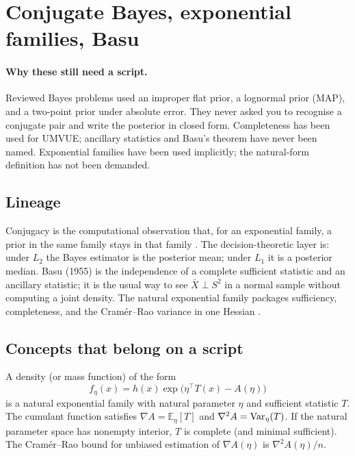 \section{Conjugate Bayes, exponential families, Basu}
\label{sec:bayes}

\paragraph{Why these still need a script.}
Reviewed Bayes problems used an improper flat prior, a lognormal prior (MAP), and a two-point prior under absolute error. They never asked you to recognise a conjugate pair and write the posterior in closed form. Completeness has been used for UMVUE; ancillary statistics and Basu's theorem have never been named. Exponential families have been used implicitly; the natural-form definition has not been demanded.

\subsection{Lineage}

Conjugacy is the computational observation that, for an exponential family, a prior in the same family stays in that family \cite{gelman13,hogg19}. The decision-theoretic layer is: under \(L_{2}\) the Bayes estimator is the posterior mean; under \(L_{1}\) it is a posterior median. Basu (1955) is the independence of a complete sufficient statistic and an ancillary statistic; it is the usual way to see \(\bar X\perp S^{2}\) in a normal sample without computing a joint density. The natural exponential family packages sufficiency, completeness, and the Cram\'er--Rao variance in one Hessian \cite{casella02}.

\subsection{Concepts that belong on a script}

\begin{definition}
\label{def:nef}
A density (or mass function) of the form
\[
f_{\eta}(x)=h(x)\exp\bigl(\eta^{\top}T(x)-A(\eta)\bigr)
\]
is a natural exponential family with natural parameter \(\eta\) and sufficient statistic \(T\). The cumulant function satisfies \(\nabla A=\mathbb{E}_{\eta}[T]\) and \(\nabla^{2}A=\operatorname{Var}_{\eta}(T)\). If the natural parameter space has nonempty interior, \(T\) is complete (and minimal sufficient). The Cram\'er--Rao bound for unbiased estimation of \(\nabla A(\eta)\) is \(\nabla^{2}A(\eta)/n\).
\end{definition}

